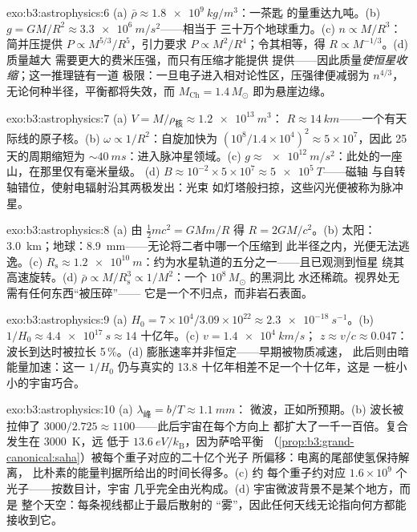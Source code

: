 \begin{solution}{exo:b3:astrophysics:6}
(a) $\bar\rho \approx \qty{1.8e9}{kg/m^3}$：一茶匙
的量重达九吨。(b) $g = GM/R^2 \approx \qty{3.3e6}{m/s^2}$——相当于
三十万个地球重力。(c) $n \propto M/R^3$：
简并压提供 $P \propto M^{5/3}/R^5$，引力要求
$P \propto M^2/R^4$；令其相等，得 $R \propto M^{-1/3}$。(d) 质量越大
需要更大的费米压强，而只有压缩才能提供
提供——因此质量\emph{使恒星收缩}；这一推理链有一道
极限：一旦电子进入相对论性区，压强律便减弱为
$n^{4/3}$，无论何种半径，平衡都将失效，而
$M_{\text{Ch}} = 1.4\,M_\odot$ 即为悬崖边缘。
\end{solution}

\begin{solution}{exo:b3:astrophysics:7}
(a) $V = M/\rho_{\text{核}} \approx \qty{1.2e13}{m^3}$：
$R \approx \qty{14}{km}$——一个有天际线的原子核。(b)
$\omega \propto 1/R^2$：自旋加快为 $(10^8/1.4\times10^4)^2
\approx 5\times10^{7}$，因此 25 天的周期缩短为
${\sim}\qty{40}{ms}$：进入脉冲星领域。(c) $g \approx
\qty{e12}{m/s^2}$：此处的一座山，在那里仅有毫米量级。
(d) $B \approx 10^{-2}\times5\times10^{7} \approx
\qty{5e5}{T}$——磁轴
与自转轴错位，使射电辐射沿其两极发出：光束
如灯塔般扫掠，这些闪光便被称为脉冲星。
\end{solution}

\begin{solution}{exo:b3:astrophysics:8}
(a) 由 $\tfrac12mc^2 = GMm/R$ 得 $R = 2GM/c^2$。(b) 太阳：
\qty{3.0}{km}；地球：\qty{8.9}{mm}——无论将二者中哪一个压缩到
此半径之内，光便无法逃逸。(c) $R_{\text{s}} \approx
\qty{1.2e10}{m}$：约为水星轨道的五分之一——且已观测到恒星
绕其高速旋转。(d) $\bar\rho \propto
M/R_{\text{s}}^3 \propto 1/M^2$：一个 $10^8\,M_\odot$ 的黑洞比
水还稀疏。视界处无需有任何东西“被压碎”——
它是一个不归点，而非岩石表面。
\end{solution}

\begin{solution}{exo:b3:astrophysics:9}
(a) $H_0 = 7\times10^4/3.09\times10^{22} \approx
\qty{2.3e-18}{s^{-1}}$。(b) $1/H_0 \approx \qty{4.4e17}{s}
\approx 14$ 十亿年。(c) $v = \qty{1.4e4}{km/s}$；
$z \approx v/c \approx 0.047$：波长到达时被拉长
5\,\%。(d) 膨胀速率并非恒定——早期被物质减速，
此后则由暗能量加速：这一
$1/H_0$ 仍与真实的 13.8 十亿年相差不足一个十亿年，这是
一桩小小的宇宙巧合。
\end{solution}

\begin{solution}{exo:b3:astrophysics:10}
(a) $\lambda_{\text{峰}} = b/T \approx \qty{1.1}{mm}$：
微波，正如所预期。(b) 波长被拉伸了 $3000/2.725 \approx
1100$——此后宇宙在每个方向上
都扩大了一千一百倍。复合发生在 \qty{3000}{K}，远
低于 $\qty{13.6}{eV}/k_{\text{B}}$，因为萨哈平衡
（\cref{prop:b3:grand-canonical:saha}）被每个重子对应的二十亿个光子
所偏移：电离的尾部使氢保持解离，
比朴素的能量判据所给出的时间长得多。(c) 约
每个重子约对应 $1.6\times10^{9}$ 个光子——按数目计，宇宙
几乎完全由光构成。(d) 宇宙微波背景不是某个地方，而是
整个天空：每条视线都止于最后散射的
“雾”，因此任何天线无论指向何方都能接收到它。
\end{solution}

